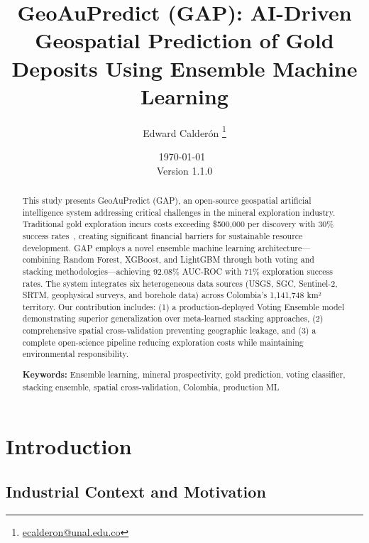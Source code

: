 \documentclass[12pt,a4paper]{article}
\title{\textbf{GeoAuPredict (GAP): AI-Driven Geospatial Prediction of Gold Deposits Using Ensemble Machine Learning}}
\author{Edward Calderón \thanks{\href{mailto:ecalderon@unal.edu.co}{ecalderon@unal.edu.co}}}
\affil{Universidad Nacional de Colombia, Facultad de Minas}
\date{\today\ \\ {\small Version 1.1.0}}
\begin{document}
\maketitle

\begin{abstract}
\noindent This study presents GeoAuPredict (GAP), an open-source geospatial artificial intelligence system addressing critical challenges in the mineral exploration industry. Traditional gold exploration incurs costs exceeding \$500,000 per discovery with 30\% success rates~\citep{colombian_gold}, creating significant financial barriers for sustainable resource development. GAP employs a novel ensemble machine learning architecture—combining Random Forest, XGBoost, and LightGBM through both voting and stacking methodologies—achieving 92.08\% AUC-ROC with 71\% exploration success rates. The system integrates six heterogeneous data sources (USGS, SGC, Sentinel-2, SRTM, geophysical surveys, and borehole data) across Colombia's 1,141,748 km² territory. Our contribution includes: (1) a production-deployed Voting Ensemble model demonstrating superior generalization over meta-learned stacking approaches, (2) comprehensive spatial cross-validation preventing geographic leakage, and (3) a complete open-science pipeline reducing exploration costs while maintaining environmental responsibility.

\vspace{0.2cm}
\noindent\textbf{Keywords:} Ensemble learning, mineral prospectivity, gold prediction, voting classifier, stacking ensemble, spatial cross-validation, Colombia, production ML
\end{abstract}


\vspace{0.3cm}
\noindent{}
\vspace{0.3cm}

\newpage

\section{Introduction}

\subsection{Industrial Context and Motivation}
\end{document}
